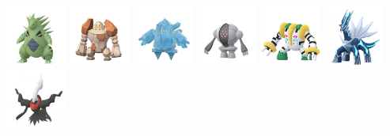 \documentclass[compress]{beamer}
\begin{document}
\begin{frame}
\begin{Large}
\begin{block}{}
\begin{center}
    \includegraphics[width=2cm]{../../images/pokemon/tyranitar.png}
    \includegraphics[width=2cm]{../../images/pokemon/regirock.png}
    \includegraphics[width=2cm]{../../images/pokemon/regice.png}
    \includegraphics[width=2cm]{../../images/pokemon/registeel.png}
    \includegraphics[width=2cm]{../../images/pokemon/regigigas.png}
    \includegraphics[width=2cm]{../../images/pokemon/dialga.png}
    \includegraphics[width=2cm]{../../images/pokemon/darkrai.png}
\end{center}
\end{block}
\end{Large}
\end{frame}

\end{document}
